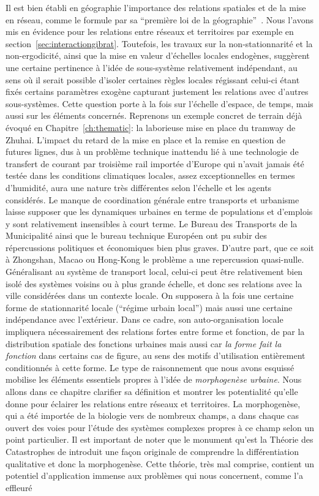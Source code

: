 Il est bien établi en géographie l'importance des relations spatiales et de la mise en réseau, comme le formule  par sa ``première loi de la géographie''~\cite{tobler2004first}. Nous l'avons mis en évidence pour les relations entre réseaux et territoires par exemple en section~\ref{sec:interactiongibrat}. Toutefois, les travaux sur la non-stationnarité et la non-ergodicité, ainsi que la mise en valeur d'échelles locales endogènes, suggèrent une certaine pertinence à l'idée de sous-système relativement indépendant, au sens où il serait possible d'isoler certaines règles locales régissant celui-ci étant fixés certains paramètres exogène capturant justement les relations avec d'autres sous-systèmes. Cette question porte à la fois sur l'échelle d'espace, de temps, mais aussi sur les éléments concernés. Reprenons un exemple concret de terrain déjà évoqué en Chapitre~\ref{ch:thematic}: la laborieuse mise en place du tramway de Zhuhai. L'impact du retard de la mise en place et la remise en question de futures lignes, dus à un problème technique inattendu lié à une technologie de transfert de courant par troisième rail importée d'Europe qui n'avait jamais été testée dans les conditions climatiques locales, assez exceptionnelles en termes d'humidité, aura une nature très différentes selon l'échelle et les agents considérés. Le manque de coordination générale entre transports et urbanisme laisse supposer que les dynamiques urbaines en terme de populations et d'emplois y sont relativement insensibles à court terme. Le Bureau des Transports de la Municipalité ainsi que le bureau technique Européen ont pu subir des répercussions politiques et économiques bien plus graves. D'autre part, que ce soit à Zhongshan, Macao ou Hong-Kong le problème a une repercussion quasi-nulle. Généralisant au système de transport local, celui-ci peut être relativement bien isolé des systèmes voisins ou à plus grande échelle, et donc ses relations avec la ville considérées dans un contexte locale. On supposera à la fois une certaine forme de stationnarité locale (``régime urbain local'') mais aussi une certaine indépendance avec l'extérieur. Dans ce cadre, son auto-organisation locale impliquera nécessairement des relations fortes entre forme et fonction, de par la distribution spatiale des fonctions urbaines mais aussi car \emph{la forme fait la fonction} dans certains cas de figure, au sens des motifs d'utilisation entièrement conditionnés à cette forme. Le type de raisonnement que nous avons esquissé mobilise les éléments essentiels propres à l'idée de \emph{morphogenèse urbaine}. Nous allons dans ce chapitre clarifier sa définition et montrer les potentialité qu'elle donne pour éclairer les relations entre réseaux et territoires. La morphogenèse, qui a été importée de la biologie vers de nombreux champs, a dans chaque cas ouvert des voies pour l'étude des systèmes complexes propres à ce champ selon un point particulier. Il est important de noter que le monument qu'est la Théorie des Catastrophes de  introduit une façon originale de comprendre la différentiation qualitative et donc la morphogenèse. Cette théorie, très mal comprise, contient un potentiel d'application immense aux problèmes qui nous concernent, comme l'a effleuré ~\noun{}




